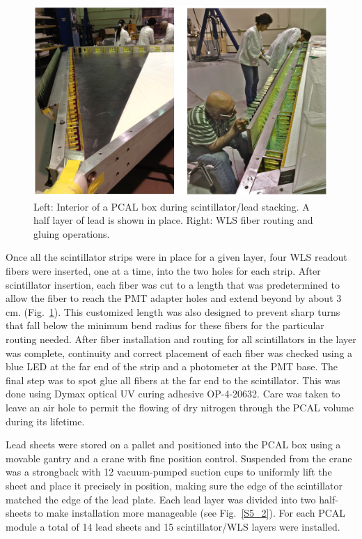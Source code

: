 \begin{figure}[hbt]
\centering
\includegraphics[width=0.95\columnwidth,keepaspectratio]{img/S5_2.png}
\caption{Left: Interior of a PCAL box during scintillator/lead stacking.  A half layer of lead is shown in place. Right: WLS fiber routing and gluing operations.}
\label{fig:S5_2}
\end{figure}

Once all the scintillator strips were in place for a given layer, four WLS readout fibers were inserted, one at a time, into the two holes for each strip.  After scintillator insertion, each fiber was cut to a length that was predetermined to allow the fiber to reach the PMT adapter holes and extend beyond by about 3 cm. (Fig.~\ref{fig:S5_2}).  This customized length was also designed to prevent sharp turns that fall below the minimum bend radius for these fibers for the particular routing needed.  After fiber installation and routing for all scintillators in the layer was complete, continuity and correct placement of each fiber was checked using a blue LED at the far end of the strip and a photometer at the PMT base.  The final step was to spot glue all fibers at the far end to the scintillator.  This was done using Dymax optical UV curing adhesive OP-4-20632.  Care was taken to leave an air hole to permit the flowing of dry nitrogen through the PCAL volume during its lifetime. 

Lead sheets were stored on a pallet and positioned into the PCAL box using a movable gantry and a crane with fine position control.  Suspended from the crane was a strongback with 12 vacuum-pumped suction cups to uniformly lift the sheet and place it precisely in position, making sure the edge of the scintillator matched the edge of the lead plate.  Each lead layer was divided into two half-sheets to make installation more manageable (see Fig.~\ref{S5_2}).  For each PCAL module a total of 14 lead sheets and 15 scintillator/WLS layers were installed.

